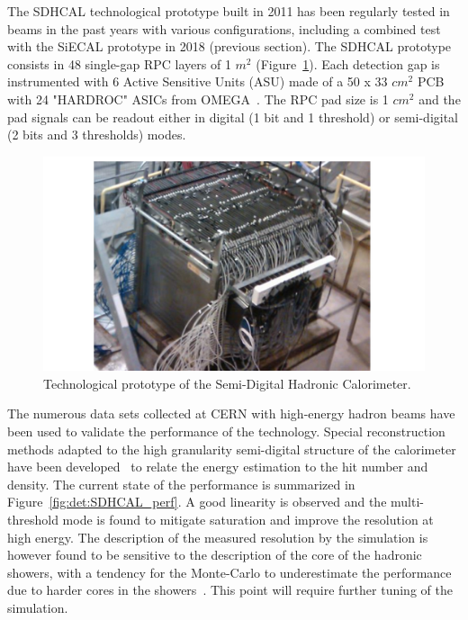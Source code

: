The SDHCAL technological prototype built in 2011 has been regularly tested in beams in the past years with various configurations, including a combined test with the SiECAL prototype in 2018 (previous section). The SDHCAL prototype consists in 48 single-gap RPC layers of 1 $m^2$ (Figure~\ref{fig:det:SDHCAL_proto}). Each detection gap is instrumented with 6 Active Sensitive Units (ASU) made of a  50 x 33 $cm^2$ PCB with 24 "HARDROC" ASICs from OMEGA~\cite{Callier:2014uqa}. The RPC pad size is 1 $cm^2$ and the pad signals can be readout either in digital (1 bit and 1 threshold) or semi-digital (2 bits and 3 thresholds) modes.

\begin{figure}[t!]
\centering
\includegraphics[width=0.8\hsize]{Detector/fig/SDHCAL_proto.jpg}
\caption{Technological prototype of the Semi-Digital Hadronic Calorimeter.}
\label{fig:det:SDHCAL_proto}
\end{figure}

The numerous data sets collected at CERN with high-energy hadron beams have been used to validate the performance of the technology. Special reconstruction methods adapted to the high granularity semi-digital structure of the calorimeter have been developed~\cite{Buridon:2016ill} to relate the energy estimation to the hit number and density. The current state of the performance is summarized in Figure~\ref{fig:det:SDHCAL_perf}. A good linearity is observed and the multi-threshold mode is found to mitigate saturation and improve the resolution at high energy. The description of the measured resolution by the simulation is however found to be sensitive to the description of the core of the hadronic showers, with a tendency for the Monte-Carlo to underestimate the performance due to harder cores in the showers~\cite{Deng:2016obt}. This point will require further tuning of the simulation.

